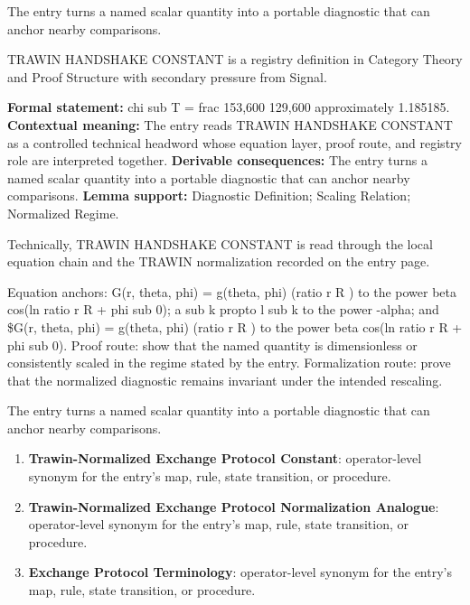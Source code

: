 The entry turns a named scalar quantity into a portable diagnostic that can anchor nearby comparisons.
\clearpage


\begingroup\small
{}
TRAWIN HANDSHAKE CONSTANT is a registry definition in Category Theory and Proof Structure with secondary pressure from Signal.

\begingroup\footnotesize\setlength{\emergencystretch}{3em}\sloppy
\textbf{Formal statement:} chi sub T = frac 153,600 129,600 approximately 1.185185. \textbf{Contextual meaning:} The entry reads TRAWIN HANDSHAKE CONSTANT as a controlled technical headword whose equation layer, proof route, and registry role are interpreted together. \textbf{Derivable consequences:} The entry turns a named scalar quantity into a portable diagnostic that can anchor nearby comparisons. \textbf{Lemma support:} Diagnostic Definition; Scaling Relation; Normalized Regime.\par
\endgroup

Technically, TRAWIN HANDSHAKE CONSTANT is read through the local equation chain and the TRAWIN normalization recorded on the entry page.

Equation anchors: G(r, theta, phi) = g(theta, phi) (ratio r R ) to the power beta cos(ln ratio r R + phi sub 0); a sub k propto l sub k to the power -alpha; and \$G(r, theta, phi) = g(theta, phi) (ratio r R ) to the power beta cos(ln ratio r R + phi sub 0). Proof route: show that the named quantity is dimensionless or consistently scaled in the regime stated by the entry. Formalization route: prove that the normalized diagnostic remains invariant under the intended rescaling.

The entry turns a named scalar quantity into a portable diagnostic that can anchor nearby comparisons.
\endgroup

\begin{enumerate}[leftmargin=1.6em,itemsep=6pt,topsep=4pt]
\item \textbf{Trawin-Normalized Exchange Protocol Constant}: operator-level synonym for the entry's map, rule, state transition, or procedure.
\item \textbf{Trawin-Normalized Exchange Protocol Normalization Analogue}: operator-level synonym for the entry's map, rule, state transition, or procedure.
\item \textbf{Exchange Protocol Terminology}: operator-level synonym for the entry's map, rule, state transition, or procedure.
\end{enumerate}

